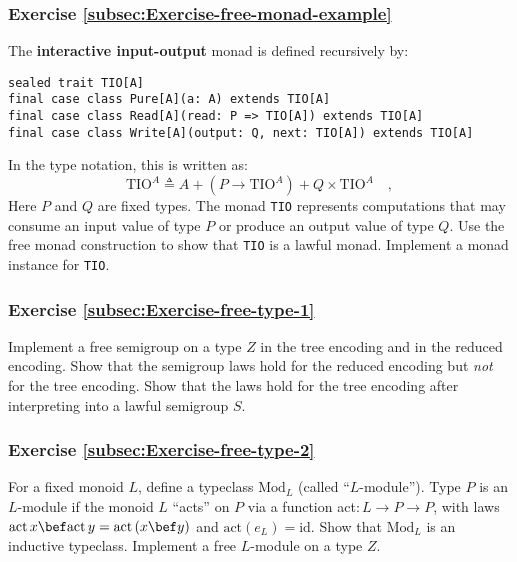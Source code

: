\subsubsection{Exercise \label{subsec:Exercise-free-monad-example}\ref{subsec:Exercise-free-monad-example}}

The \textbf{interactive input-output}
monad is defined recursively by:
\begin{lstlisting}
sealed trait TIO[A]
final case class Pure[A](a: A) extends TIO[A]
final case class Read[A](read: P => TIO[A]) extends TIO[A]
final case class Write[A](output: Q, next: TIO[A]) extends TIO[A]
\end{lstlisting}
In the type notation, this is written as:
\[
\text{TIO}^{A}\triangleq A+(P\rightarrow\text{TIO}^{A})+Q\times\text{TIO}^{A}\quad,
\]
Here $P$ and $Q$ are fixed types. The monad \lstinline!TIO!
represents computations that may consume an input value of type $P$
or produce an output value of type $Q$. Use the free monad construction
to show that \lstinline!TIO!
is a lawful monad. Implement a monad instance for \lstinline!TIO!.

\subsubsection{Exercise \label{subsec:Exercise-free-type-1}\ref{subsec:Exercise-free-type-1}}

Implement a free semigroup on a type $Z$ in the tree encoding and
in the reduced encoding. Show that the semigroup laws hold for the
reduced encoding but \emph{not} for the tree encoding. Show that the
laws hold for the tree encoding after interpreting into a lawful semigroup
$S$.

\subsubsection{Exercise \label{subsec:Exercise-free-type-2}\ref{subsec:Exercise-free-type-2}}

For a fixed monoid $L$, define a typeclass $\text{Mod}_{L}$ (called
\textsf{``}$L$-module\textsf{''}). Type $P$ is an $L$-module if the monoid $L$
\textsf{``}acts\textsf{''} on $P$ via a function act$:L\rightarrow P\rightarrow P$,
with laws $\text{act}\,x\bef\text{act}\,y=\text{act}\left(x\bef y\right)$
and $\text{act}\left(e_{L}\right)=\text{id}$. Show that $\text{Mod}_{L}$
is an inductive typeclass. Implement a free $L$-module on a type
$Z$. 

